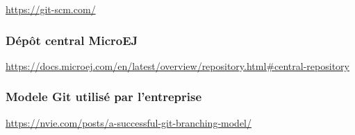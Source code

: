 \documentclass[french,a4paper,12pt]{report}
\begin{document}
\href{https://git-scm.com/}{https://git-scm.com/}

\subsubsection{Dépôt central MicroEJ}

\href{https://docs.microej.com/en/latest/overview/repository.html\#central-repository}{https://docs.microej.com/en/latest/overview/repository.html\#central-repository}

\subsubsection{Modele Git utilisé par l'entreprise}

\href{https://nvie.com/posts/a-successful-git-branching-model/}{https://nvie.com/posts/a-successful-git-branching-model/}
\end{document}
